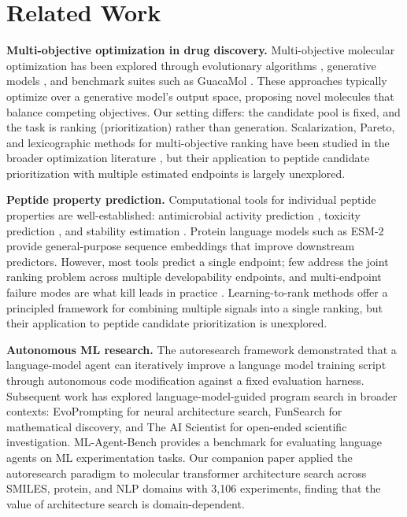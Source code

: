\section{Related Work}
\label{sec:related_work}

\textbf{Multi-objective optimization in drug discovery.}
Multi-objective molecular optimization has been explored through evolutionary algorithms \citep{deb2002nsga2,zhang2007moead}, generative models \citep{jin2020multiobjective,xie2021mars}, and benchmark suites such as GuacaMol \citep{brown2019guacamol}.
These approaches typically optimize over a generative model's output space, proposing novel molecules that balance competing objectives.
Our setting differs: the candidate pool is fixed, and the task is ranking (prioritization) rather than generation.
Scalarization, Pareto, and lexicographic methods for multi-objective ranking have been studied in the broader optimization literature \citep{emmerich2018tutorial}, but their application to peptide candidate prioritization with multiple estimated endpoints is largely unexplored.

\textbf{Peptide property prediction.}
Computational tools for individual peptide properties are well-established: antimicrobial activity prediction \citep{veltri2018ampscanner,mooney2012peptideranker}, toxicity prediction \citep{rathore2024toxinpred3}, and stability estimation \citep{sharma2014hlp}.
Protein language models such as ESM-2 \citep{lin2023esm2} provide general-purpose sequence embeddings that improve downstream predictors.
However, most tools predict a single endpoint; few address the joint ranking problem across multiple developability endpoints, and multi-endpoint failure modes are what kill leads in practice \citep{yan2022review}.
Learning-to-rank methods \citep{liu2009learningtorank,burges2010ranknet} offer a principled framework for combining multiple signals into a single ranking, but their application to peptide candidate prioritization is unexplored.

\textbf{Autonomous ML research.}
The autoresearch framework \citep{karpathy2026autoresearch} demonstrated that a language-model agent can iteratively improve a language model training script through autonomous code modification against a fixed evaluation harness.
Subsequent work has explored language-model-guided program search in broader contexts: EvoPrompting \citep{chen2023evoprompting} for neural architecture search, FunSearch \citep{romeraparedes2024funsearch} for mathematical discovery, and The AI Scientist \citep{lu2024aiscientist} for open-ended scientific investigation.
ML-Agent-Bench \citep{huang2024mlagentbench} provides a benchmark for evaluating language agents on ML experimentation tasks.
Our companion paper \citep{wijaya2026autonomousagentdiscoversmolecular} applied the autoresearch paradigm to molecular transformer architecture search across SMILES, protein, and NLP domains with 3{,}106 experiments, finding that the value of architecture search is domain-dependent.

